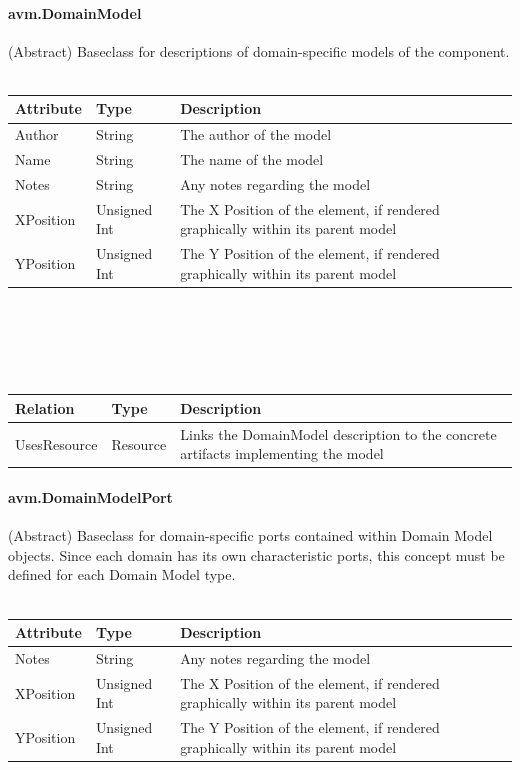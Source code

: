 \paragraph{avm.DomainModel}
(Abstract) Baseclass for descriptions of domain-specific models of the component.
\\ \\
\begin{tabular}{ l l p{12cm} }
\textbf{Attribute} & \textbf{Type} & \textbf{Description} \\ \hline
Author & String & The author of the model \\ \hline
Name & String & The name of the model \\ \hline
Notes & String & Any notes regarding the model \\ \hline
XPosition & Unsigned Int & The X Position of the element, if rendered graphically within its parent model \\ \hline
YPosition & Unsigned Int & The Y Position of the element, if rendered graphically within its parent model \\ \hline
\end{tabular}
\\ \\ \\ \\
\begin{tabular}{ l l p{12cm} }
\textbf{Relation} & \textbf{Type} & \textbf{Description} \\ \hline
UsesResource & Resource & Links the DomainModel description to the concrete artifacts implementing the model \\ \hline
\end{tabular}

\paragraph{avm.DomainModelPort}
(Abstract) Baseclass for domain-specific ports contained within Domain Model objects. Since each domain has its own characteristic ports, this concept must be defined for each Domain Model type.
\\ \\
\begin{tabular}{ l l p{12cm} }
\textbf{Attribute} & \textbf{Type} & \textbf{Description} \\ \hline
Notes & String & Any notes regarding the model \\ \hline
XPosition & Unsigned Int & The X Position of the element, if rendered graphically within its parent model \\ \hline
YPosition & Unsigned Int & The Y Position of the element, if rendered graphically within its parent model \\ \hline
\end{tabular}


